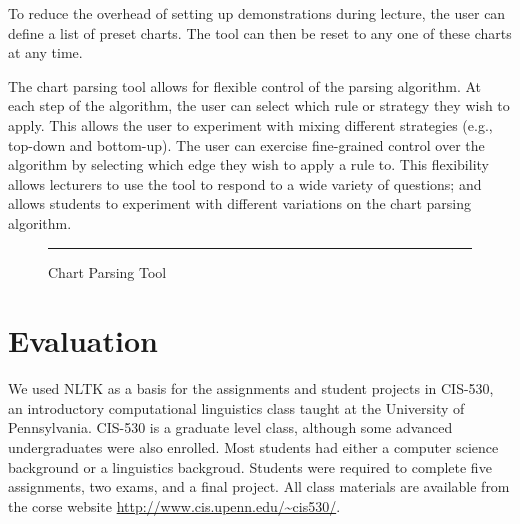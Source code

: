 \documentclass[11pt]{article}
\begin{document}
To reduce the overhead of setting up demonstrations during lecture,
the user can define a list of preset charts.  The tool can then be
reset to any one of these charts at any time.

The chart parsing tool allows for flexible control of the parsing
algorithm.  At each step of the algorithm, the user can select which
rule or strategy they wish to apply.  This allows the user to
experiment with mixing different strategies (e.g., top-down and
bottom-up).  The user can exercise fine-grained control over the
algorithm by selecting which edge they wish to apply a rule to.  This
flexibility allows lecturers to use the tool to respond to a wide
variety of questions; and allows students to experiment with different
variations on the chart parsing algorithm.

\begin{figure}
\centerline{}
\caption{Chart Parsing Tool}\label{fig:chartparse}
\vspace*{2ex}\hrule
\end{figure}

\section{Evaluation}
\label{sec:evaluation}

We used NLTK as a basis for the assignments and student projects in
CIS-530, an introductory computational linguistics class taught at the
University of Pennsylvania.  CIS-530 is a graduate level class,
although some advanced undergraduates were also enrolled.  Most
students had either a computer science background or a linguistics
backgroud.  Students were required to complete five assignments, two
exams, and a final project.  All class materials are available from
the corse website \url{http://www.cis.upenn.edu/~cis530/}.


\end{document}
